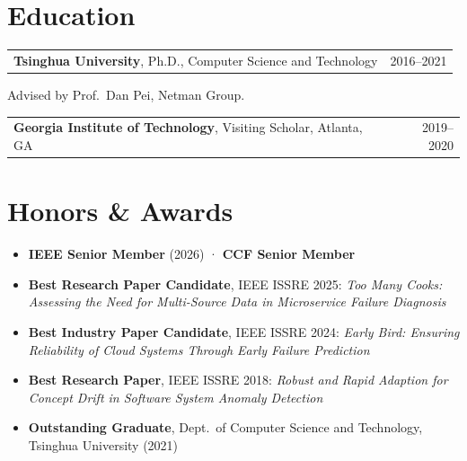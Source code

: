 \documentclass[10pt,letterpaper]{article}
\begin{document}
\section{Education}
\begin{tabularx}{\linewidth}{@{}X r@{}}
  \textbf{Tsinghua University}, Ph.D., Computer Science and Technology & {\color{subtle}\small 2016–2021}\\
\end{tabularx}
{\color{subtle}\small\hspace{1.2em}Advised by Prof.\ Dan Pei, Netman Group.}\par
\vspace{0.5ex}
\begin{tabularx}{\linewidth}{@{}X r@{}}
  \textbf{Georgia Institute of Technology}, Visiting Scholar, Atlanta, GA & {\color{subtle}\small 2019–2020}\\
\end{tabularx}

\section{Honors \& Awards}
\begin{itemize}
  \item \textbf{IEEE Senior Member} (2026) \textnormal{·} \textbf{CCF Senior Member}
  \item \textbf{Best Research Paper Candidate}, IEEE ISSRE 2025: \emph{Too Many Cooks: Assessing the Need for Multi-Source Data in Microservice Failure Diagnosis}
  \item \textbf{Best Industry Paper Candidate}, IEEE ISSRE 2024: \emph{Early Bird: Ensuring Reliability of Cloud Systems Through Early Failure Prediction}
  \item \textbf{Best Research Paper}, IEEE ISSRE 2018: \emph{Robust and Rapid Adaption for Concept Drift in Software System Anomaly Detection}
  \item \textbf{Outstanding Graduate}, Dept.\ of Computer Science and Technology, Tsinghua University (2021)
\end{itemize}

\end{document}
